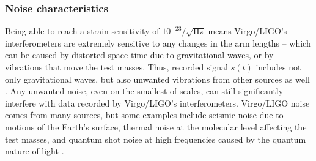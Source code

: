 \documentclass[preprint,
letterpaper,
 amsmath,amssymb,
 aps,
]{revtex4-2}
\begin{document}
\subsubsection{Noise characteristics}
Being able to reach a strain sensitivity of $10^{-23}/\sqrt{\text{Hz}}$ \cite{sensitivity} means Virgo/LIGO's interferometers are extremely sensitive to any changes in the arm lengths – which can be caused by distorted space-time due to gravitational waves, or by vibrations that move the test masses. Thus, recorded signal $s(t)$ includes not only gravitational waves, but also unwanted vibrations from other sources as well \cite{ultimate}. Any unwanted noise, even on the smallest of scales, can still significantly interfere with data recorded by Virgo/LIGO's interferometers. Virgo/LIGO noise comes from many sources, but some examples include seismic noise due to motions of the Earth's surface, thermal noise at the molecular level affecting the test masses, and quantum shot noise at high frequencies caused by the quantum nature of light \cite{blair_howell_ju_zhao_2012}.
\end{document}
